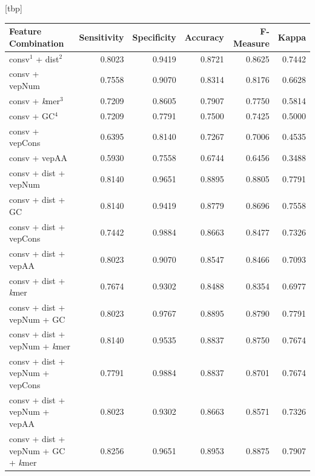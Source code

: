 \documentclass[a4paper,nohyper,nobib,openany,justified]{tufte-book}
\makeatletter
\renewenvironment{table}[1][htbp]{%
  \@tufte@orig@float{table}[#1]%
}{%
  \@tufte@orig@endfloat
}
\makeatother
\begin{document}
\begin{fullwidth}
\begin{table}[tbp]
  \begin{center}
    \footnotesize%
    \begin{tabular}{p{6.5cm} rrrrr}
      \toprule
      Feature Combination & Sensitivity & Specificity & Accuracy & F-Measure & Kappa \\
      \midrule
    consv$^1$ + dist$^2$                                        & 0.8023 & 0.9419 & 0.8721 & 0.8625 & 0.7442 \\
    consv + vepNum                                      & 0.7558 & 0.9070 & 0.8314 & 0.8176 & 0.6628 \\
    consv + \emph{k}mer$^3$                                        & 0.7209 & 0.8605 & 0.7907 & 0.7750 & 0.5814 \\
    consv + GC$^4$                                          & 0.7209 & 0.7791 & 0.7500 & 0.7425 & 0.5000 \\
    consv + vepCons                                     & 0.6395 & 0.8140 & 0.7267 & 0.7006 & 0.4535 \\
    consv + vepAA                                       & 0.5930 & 0.7558 & 0.6744 & 0.6456 & 0.3488 \\\midrule
    consv + dist + vepNum                               & 0.8140 & 0.9651 & 0.8895 & 0.8805 & 0.7791 \\
    consv + dist + GC                                   & 0.8140 & 0.9419 & 0.8779 & 0.8696 & 0.7558 \\
    consv + dist + vepCons                              & 0.7442 & 0.9884 & 0.8663 & 0.8477 & 0.7326 \\
    consv + dist + vepAA                                & 0.8023 & 0.9070 & 0.8547 & 0.8466 & 0.7093 \\
    consv + dist + \emph{k}mer                                 & 0.7674 & 0.9302 & 0.8488 & 0.8354 & 0.6977 \\\midrule
    consv + dist + vepNum + GC                          & 0.8023 & 0.9767 & 0.8895 & 0.8790 & 0.7791 \\
    consv + dist + vepNum + \emph{k}mer                        & 0.8140 & 0.9535 & 0.8837 & 0.8750 & 0.7674 \\
    consv + dist + vepNum + vepCons                     & 0.7791 & 0.9884 & 0.8837 & 0.8701 & 0.7674 \\
    consv + dist + vepNum + vepAA                       & 0.8023 & 0.9302 & 0.8663 & 0.8571 & 0.7326 \\\midrule
    consv + dist + vepNum + GC + \emph{k}mer                   & 0.8256 & 0.9651 & 0.8953 & 0.8875 & 0.7907 \\

\end{tabular}
\end{center}
\end{table}
\end{fullwidth}
\end{document}
